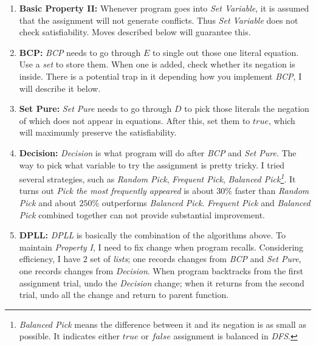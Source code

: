 \documentclass[a4paper,10pt]{article}
\begin{document}
\begin{enumerate}
\item \textbf{Basic Property II:} Whenever program goes into \textit{Set Variable}, it is 
    assumed that the assignment will not generate conflicts. Thus \textit{Set Variable} does
    not check satisfiability. Moves described below will guarantee this.
\item \textbf{BCP:} \textit{BCP} needs to go through $E$ to single out those one literal
    equation. Use a \textit{set} to store them. When one is added, check whether 
    its negation is inside. There is a potential trap in it depending how you implement 
    \textit{BCP}, I will describe it below.
\item \textbf{Set Pure:} \textit{Set Pure} needs to go through $D$ to pick those literals
    the negation of which does not appear in equations. After this, set them to $true$,
    which will maximumly preserve the satisfiability.
\item \textbf{Decision:} \textit{Decision} is what program will do after
    \textit{BCP} and \textit{Set Pure}. The way to pick what variable to try the assignment
    is pretty tricky. I tried several strategies,
    such as \textit{Random Pick}, \textit{Frequent
    Pick}, \textit{Balanced Pick\footnote{\textit{Balanced Pick} means
    the difference between it and its negation is as small as possible. It indicates either
    $true$ or $false$ assignment is balanced in \textit{DFS}.}}. It turns out
    \textit{Pick the most frequently appeared} is about $30\%$ faster than \textit{Random
    Pick} and about $250\%$ outperforms \textit{Balanced Pick}. 
    \textit{Frequent Pick} and \textit{Balanced Pick} combined together
    can not provide substantial improvement. 
\item \textbf{DPLL:} \textit{DPLL} is basically the combination of the algorithms above. 
    To maintain \textit{Property I}, I need to fix change when program recalls.
    Considering
    efficiency, I have $2$ set of \textit{lists}; one records changes from \textit{BCP} and
    \textit{Set Pure}, one records changes from \textit{Decision}. When program backtracks
    from the first assignment trial,
    undo the \textit{Decision} change; when it returns from 
    the second trial, undo all the change and return to parent function.
\end{enumerate}
\end{document}
